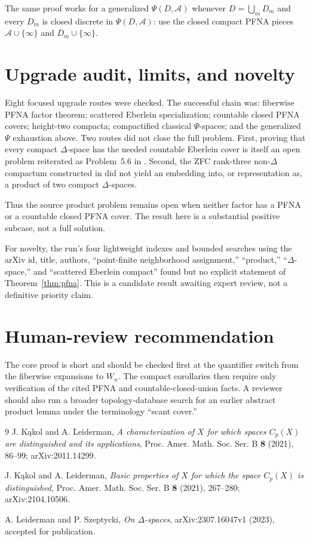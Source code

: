 \documentclass[11pt]{article}
\begin{document}
The same proof works for a generalized $\Psi(D,\mathcal A)$ whenever
$D=\bigcup_mD_m$ and every $D_m$ is closed discrete in
$\Psi(D,\mathcal A)$: use the closed compact PFNA pieces
$\mathcal A\cup\{\infty\}$ and $D_m\cup\{\infty\}$.

\section{Upgrade audit, limits, and novelty}

Eight focused upgrade routes were checked.  The successful chain was:
fiberwise PFNA factor theorem; scattered Eberlein specialization; countable
closed PFNA covers; height-two compacta; compactified classical
$\Psi$-spaces; and the generalized $\Psi$ exhaustion above.  Two routes did
not close the full problem.  First, proving that every compact $\Delta$-space
has the needed countable Eberlein cover is itself an open problem reiterated
as Problem~5.6 in \cite{LS}.  Second, the ZFC rank-three non-$\Delta$ compactum
constructed in \cite[Corollary~4.6]{LS} did not yield an embedding into, or
representation as, a product of two compact $\Delta$-spaces.

Thus the source product problem remains open when neither factor has a PFNA
or a countable closed PFNA cover.  The result here is a substantial positive
subcase, not a full solution.

For novelty, the run's four lightweight indexes and bounded searches using
the arXiv id, title, authors, ``point-finite neighborhood assignment,''
``product,'' ``$\Delta$-space,'' and ``scattered Eberlein compact'' found
\cite{KL2,LS} but no explicit statement of Theorem~\ref{thm:pfna}.  This is a
candidate result awaiting expert review, not a definitive priority claim.

\section*{Human-review recommendation}

The core proof is short and should be checked first at the quantifier switch
from the fiberwise expansions to $W_n$.  The compact corollaries then require
only verification of the cited PFNA and countable-closed-union facts.  A
reviewer should also run a broader topology-database search for an earlier
abstract product lemma under the terminology ``scant cover.''

\begin{thebibliography}{9}
J. K\k{a}kol and A. Leiderman,
\emph{A characterization of $X$ for which spaces $C_p(X)$ are distinguished
and its applications}, Proc. Amer. Math. Soc. Ser. B \textbf{8} (2021),
86--99; arXiv:2011.14299.

J. K\k{a}kol and A. Leiderman,
\emph{Basic properties of $X$ for which the space $C_p(X)$ is distinguished},
Proc. Amer. Math. Soc. Ser. B \textbf{8} (2021), 267--280;
arXiv:2104.10506.

A. Leiderman and P. Szeptycki,
\emph{On $\Delta$-spaces}, arXiv:2307.16047v1 (2023), accepted for
publication.
\end{thebibliography}
\end{document}
